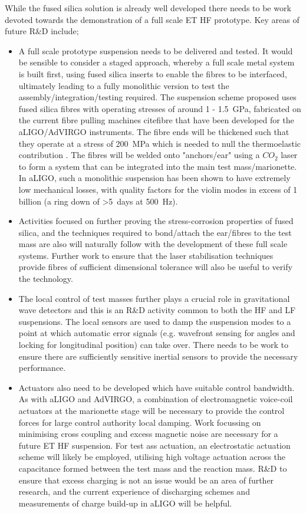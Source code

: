 While the fused silica solution is already well developed there needs to be work devoted towards the demonstration of a full scale ET HF prototype. Key areas of future R\&D include;
\begin{itemize}
\item A full scale prototype suspension needs to be delivered and tested. It would be sensible to consider a staged approach, whereby a full scale metal system is built first, using fused silica inserts to enable the fibres to be interfaced, ultimately leading to a fully monolithic version to test the assembly/integration/testing required. The suspension scheme proposed uses fused silica fibres with operating stresses of around 1 - 1.5~GPa, fabricated on the current fibre pulling machines cite{fibre} that have been developed for the aLIGO/AdVIRGO instruments. The fibre ends will be thickened such that they operate at a stress of 200~MPa which is needed to null the thermoelastic contribution \cite{Bell:2013}. The fibres will be welded onto "anchors/ear" using a $CO_{2}$ laser to form a system that can be integrated into the main test mass/marionette. In aLIGO, such a monolithic suspension has been shown to have extremely low mechanical losses, with quality factors for the violin modes in excess of 1 billion (a ring down of >5~days at 500~Hz).
\item Activities focused on further proving the stress-corrosion properties of fused silica, and the techniques required to bond/attach the ear/fibres to the test mass are also will naturally follow with the development of these full scale systems. Further work to ensure that the laser stabilisation techniques provide fibres of sufficient dimensional tolerance will also be useful to verify the technology.
\item The local control of test masses further plays a crucial role in gravitational wave detectors and this is an R\&D activity common to both the HF and LF suspensions. The local sensors are used to damp the suspension modes to a point at which automatic error signals (e.g. wavefront sensing for angles and locking for longitudinal position) can take over. There needs to be work to ensure there are sufficiently sensitive inertial sensors to provide the necessary performance.%
\item Actuators also need to be developed which have suitable control bandwidth. As with aLIGO and AdVIRGO, a combination of electromagnetic voice-coil actuators at the marionette stage will be necessary to provide the control forces for large control authority local damping. Work focussing on minimising cross coupling and excess magnetic noise are necessary for a future ET HF suspension. For test ass actuation, an electrostatic actuation scheme will likely be employed, utilising high voltage actuation across the capacitance formed between the test mass and the reaction mass. R\&D to ensure that excess charging is not an issue would be an area of further research, and the current experience of discharging schemes and measurements of charge build-up in aLIGO will be helpful. 
\end{itemize}
